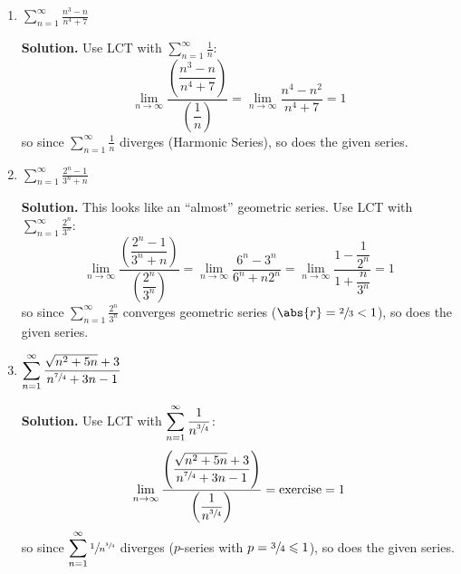 \begin{Example}{}{}
    \begin{enumerate}[label=(\roman*)]
        \item $ \displaystyle  \sum\limits_{n=1}^{\infty} \frac{n^3-n}{n^4+7} $

              \textbf{Solution.}
              Use LCT with $ \displaystyle \sum\limits_{n=1}^{\infty} \frac{1}{n} $:
              \[ \lim\limits_{{n} \to {\infty}} \frac{\left( \dfrac{n^3-n}{n^4+7} \right)}{
                      \left( \dfrac{1}{n} \right)
                  }
                  =\lim\limits_{{n} \to {\infty}} \frac{n^4-n^2}{n^4+7}
                  =1 \]
              so since $ \displaystyle \sum\limits_{n=1}^{\infty} \frac{1}{n}  $ diverges (Harmonic Series),
              so does the given series.
        \item $ \displaystyle \sum\limits_{n=1}^{\infty} \frac{2^n-1}{3^n+n} $

              \textbf{Solution.}
              This looks like an ``almost'' geometric series. Use LCT with $ \displaystyle \sum\limits_{n=1}^{\infty}
                  \frac{2^n}{3^n} $:
              \[ \lim\limits_{{n} \to {\infty}}\frac{\left( \dfrac{2^n-1}{3^n+n} \right)}{
                      \left( \dfrac{2^n}{3^n} \right)
                  }
                  =\lim\limits_{{n} \to {\infty}} \frac{6^n-3^n}{6^n+n2^n}=
                  \lim\limits_{{n} \to {\infty}} \frac{1-\dfrac{1}{2^n}}{1+\dfrac{n}{3^n}}
                  =1 \]
              so since $ \displaystyle \sum\limits_{n=1}^{\infty} \frac{2^n}{3^n} $ converges
              geometric series ($ \abs{r}=\sfrac{2}{3} <1 $), so does
              the given series.
        \item $ \displaystyle \sum\limits_{n=1}^{\infty} \frac{\sqrt{n^2+5n}+3}{n^{\sfrac{7}{4}}+3n-1} $

              \textbf{Solution.}
              Use LCT with $ \displaystyle \sum\limits_{n=1}^{\infty} \frac{1}{n^{\sfrac{3}{4}}} $:
              \[ \lim\limits_{{n} \to {\infty}}
                  \frac{
                      \left( \dfrac{\sqrt{n^2+5n}+3}{n^{\sfrac{7}{4}}+3n-1} \right)
                  }{
                      \left( \dfrac{1}{n^{\sfrac{3}{4}}} \right)
                  }
                  =\text{exercise}=1  \]
              so since $ \displaystyle \sum\limits_{n=1}^{\infty} \sfrac{1}{n^{\sfrac{3}{4}}}  $ diverges
              ($ p $-series with $ p=\sfrac{3}{4}\leqslant 1 $), so does the given series.
    \end{enumerate}
\end{Example}

